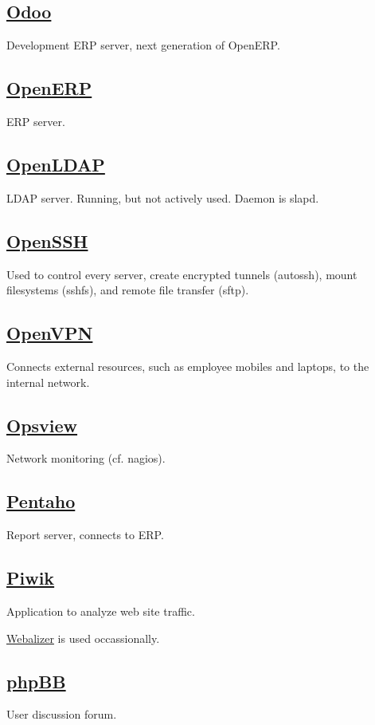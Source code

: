 \subsection{\href{http://www.odoo.com/}{Odoo}}
Development ERP server, next generation of OpenERP.

\subsection{\href{http://www.openerp.org/}{OpenERP}}
ERP server.

\subsection{\href{http://www.openldap.org/}{OpenLDAP}}
LDAP server. Running, but not actively used. Daemon is slapd.

\subsection{\href{http://www.openssh.com/}{OpenSSH}}
Used to control every server, create encrypted tunnels (autossh),
mount filesystems (sshfs), and remote file transfer (sftp).

\subsection{\href{http://openvpn.net/}{OpenVPN}}
Connects external resources, such as employee mobiles and laptops, to the internal network.

\subsection{\href{http://www.opsview.com/}{Opsview}}
Network monitoring (cf. nagios).

\subsection{\href{http://community.pentaho.com/}{Pentaho}}
Report server, connects to ERP.

\subsection{\href{https://www.piwiki.org/}{Piwik}}
Application to analyze web site traffic.

\href{http://www.mrunix.net/webalizer/}{Webalizer} is used occassionally.

\subsection{\href{https://www.phpbb.com/}{phpBB}}
User discussion forum.

